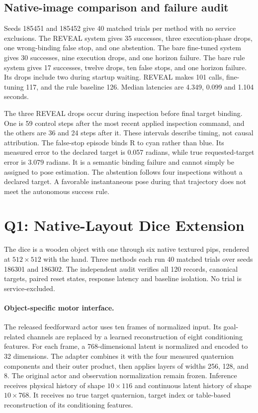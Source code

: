 \subsection{Native-image comparison and failure audit}
Seeds 185451 and 185452 give 40 matched trials per method with no service exclusions. The REVEAL system gives 35 successes, three execution-phase drops, one wrong-binding false stop, and one abstention. The bare fine-tuned system gives 30 successes, nine execution drops, and one horizon failure. The bare rule system gives 17 successes, twelve drops, ten false stops, and one horizon failure. Its drops include two during startup waiting. REVEAL makes 101 calls, fine-tuning 117, and the rule baseline 126. Median latencies are 4.349, 0.099 and 1.104 seconds.

The three REVEAL drops occur during inspection before final target binding. One is 59 control steps after the most recent applied inspection command, and the others are 36 and 24 steps after it. These intervals describe timing, not causal attribution. The false-stop episode binds R to cyan rather than blue. Its measured error to the declared target is 0.057 radians, while true requested-target error is 3.079 radians. It is a semantic binding failure and cannot simply be assigned to pose estimation. The abstention follows four inspections without a declared target. A favorable instantaneous pose during that trajectory does not meet the autonomous success rule.

\section{Q1: Native-Layout Dice Extension}
\label{sec:dice-extension}
The dice is a wooden object with one through six native textured pips, rendered at $512\times512$ with the hand. Three methods each run 40 matched trials over seeds 186301 and 186302. The independent audit verifies all 120 records, canonical targets, paired reset states, response latency and baseline isolation. No trial is service-excluded.

\paragraph{Object-specific motor interface.}
The released feedforward actor uses ten frames of normalized input. Its goal-related channels are replaced by a learned reconstruction of eight conditioning features. For each frame, a 768-dimensional latent is normalized and encoded to 32 dimensions. The adapter combines it with the four measured quaternion components and their outer product, then applies layers of widths 256, 128, and 8. The original actor and observation normalization remain frozen. Inference receives physical history of shape $10\times116$ and continuous latent history of shape $10\times768$. It receives no true target quaternion, target index or table-based reconstruction of its conditioning features.


